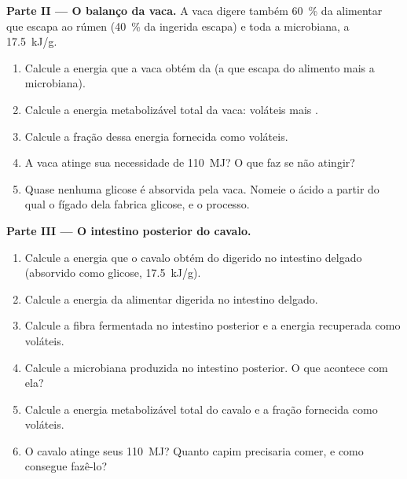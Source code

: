 \begin{problem}
\medskip
\noindent\textbf{Parte II --- O balanço da vaca.}
A vaca digere também \qty{60}{\%} da  alimentar que escapa ao
rúmen (\qty{40}{\%} da  ingerida escapa) e toda a 
microbiana, a \qty{17.5}{kJ/g}.
\begin{enumerate}[resume]
  \item Calcule a energia que a vaca obtém da  (a que escapa
        do alimento mais a microbiana).
  \item Calcule a energia metabolizável total da vaca: 
        voláteis mais .
  \item Calcule a fração dessa energia fornecida como 
        voláteis.
  \item A vaca atinge sua necessidade de \qty{110}{MJ}? O que faz se
        não atingir?
  \item Quase nenhuma glicose é absorvida pela vaca. Nomeie o ácido a
        partir do qual o fígado dela fabrica glicose, e o processo.
\end{enumerate}

\medskip
\noindent\textbf{Parte III --- O intestino posterior do cavalo.}
\begin{enumerate}[resume]
  \item Calcule a energia que o cavalo obtém do  digerido no
        intestino delgado (absorvido como glicose, \qty{17.5}{kJ/g}).
  \item Calcule a energia da  alimentar digerida no intestino
        delgado.
  \item Calcule a fibra fermentada no intestino posterior e a energia
        recuperada como  voláteis.
  \item Calcule a  microbiana produzida no intestino
        posterior. O que acontece com ela?
  \item Calcule a energia metabolizável total do cavalo e a fração
        fornecida como  voláteis.
  \item O cavalo atinge seus \qty{110}{MJ}? Quanto capim precisaria
        comer, e como consegue fazê-lo?
\end{enumerate}


\end{problem}

